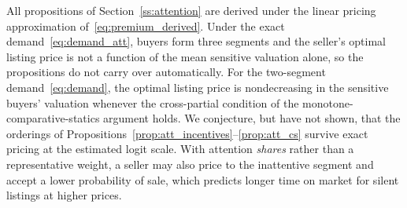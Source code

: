 All propositions of Section~\ref{ss:attention} are derived under the linear pricing approximation of~\eqref{eq:premium_derived}. Under the exact demand~\eqref{eq:demand_att}, buyers form three segments and the seller's optimal listing price is not a function of the mean sensitive valuation alone, so the propositions do not carry over automatically. For the two-segment demand~\eqref{eq:demand}, the optimal listing price is nondecreasing in the sensitive buyers' valuation whenever the cross-partial condition of the monotone-comparative-statics argument holds. We conjecture, but have not shown, that the orderings of Propositions~\ref{prop:att_incentives}--\ref{prop:att_cs} survive exact pricing at the estimated logit scale. With attention \emph{shares} rather than a representative weight, a seller may also price to the inattentive segment and accept a lower probability of sale, which predicts longer time on market for silent listings at higher prices.
